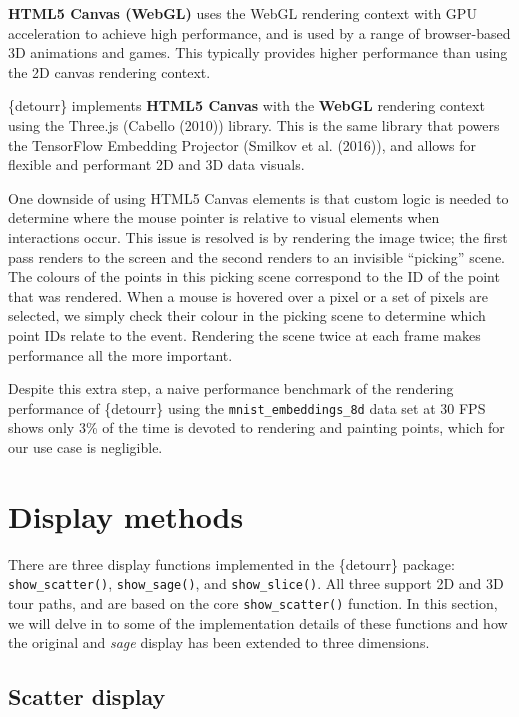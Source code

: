 \textbf{HTML5 Canvas (WebGL)} uses the WebGL rendering context with GPU acceleration to achieve high performance, and is used by a range of browser-based 3D animations and games. This typically provides higher performance than using the 2D canvas rendering context.

\{detourr\} implements \textbf{HTML5 Canvas} with the \textbf{WebGL} rendering context using the Three.js (Cabello (2010)) library. This is the same library that powers the TensorFlow Embedding Projector (Smilkov et al. (2016)), and allows for flexible and performant 2D and 3D data visuals.

One downside of using HTML5 Canvas elements is that custom logic is needed to determine where the mouse pointer is relative to visual elements when interactions occur. This issue is resolved is by rendering the image twice; the first pass renders to the screen and the second renders to an invisible ``picking'' scene. The colours of the points in this picking scene correspond to the ID of the point that was rendered. When a mouse is hovered over a pixel or a set of pixels are selected, we simply check their colour in the picking scene to determine which point IDs relate to the event. Rendering the scene twice at each frame makes performance all the more important.

Despite this extra step, a naive performance benchmark of the rendering performance of \{detourr\} using the \texttt{mnist\_embeddings\_8d} data set at 30 FPS shows only 3\% of the time is devoted to rendering and painting points, which for our use case is negligible.

\hypertarget{display-methods-1}{%
\section{Display methods}\label{display-methods-1}}

There are three display functions implemented in the \{detourr\} package: \texttt{show\_scatter()}, \texttt{show\_sage()}, and \texttt{show\_slice()}. All three support 2D and 3D tour paths, and are based on the core \texttt{show\_scatter()} function. In this section, we will delve in to some of the implementation details of these functions and how the original and \emph{sage} display has been extended to three dimensions.

\hypertarget{scatter-display}{%
\subsection{Scatter display}\label{scatter-display}}

